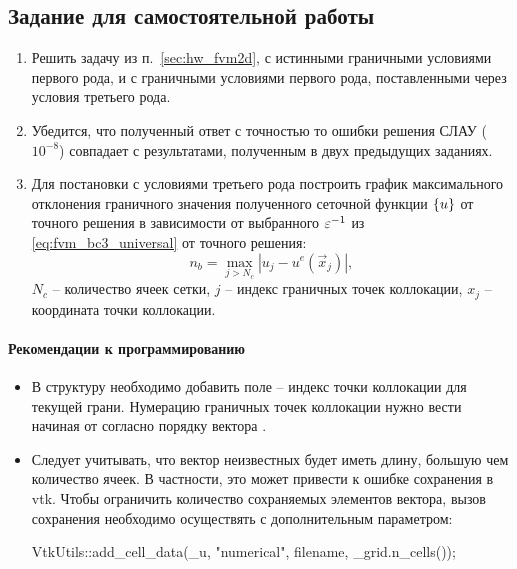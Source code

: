 \subsection{Задание для самостоятельной работы}
\begin{enumerate}
\item
Решить задачу из п.~\ref{sec:hw_fvm2d}, 
с истинными граничными условиями первого рода,
и с граничными условиями первого рода, поставленными
через условия третьего рода.
\item
Убедится, что полученный ответ
с точностью то ошибки решения СЛАУ ($10^{-8}$)
совпадает с результатами, полученным
в двух предыдущих заданиях.
\item
Для постановки с условиями третьего рода
построить график максимального
отклонения граничного значения
полученного сеточной функции $\left\{u\right\}$ от точного решения в зависимости от выбранного $\varepsilon^{-1}$ из \cref{eq:fvm_bc3_universal}
от точного решения:
$$
n_b = \max_{j > N_c} |u_j - u^e(\vec x_j)|,
$$
$N_c$ -- количество ячеек сетки, $j$ -- индекс граничных точек коллокации, $x_j$ -- координата точки коллокации.

\end{enumerate}

\paragraph{Рекомендации к программированию}
\begin{itemize}
\item
В структуру  необходимо добавить
поле  -- индекс точки коллокации для текущей грани.
Нумерацию граничных точек коллокации нужно вести
начиная от  согласно
порядку вектора .
\item
Следует учитывать, что вектор неизвестных  
будет иметь длину, большую чем количество ячеек.
В частности, это может привести к ошибке сохранения в vtk.
Чтобы ограничить количество сохраняемых элементов вектора,
вызов сохранения необходимо осуществять с дополнительным параметром:
\begin{cppcode}
	VtkUtils::add_cell_data(_u, "numerical", filename, _grid.n_cells());
\end{cppcode}

\end{itemize}

